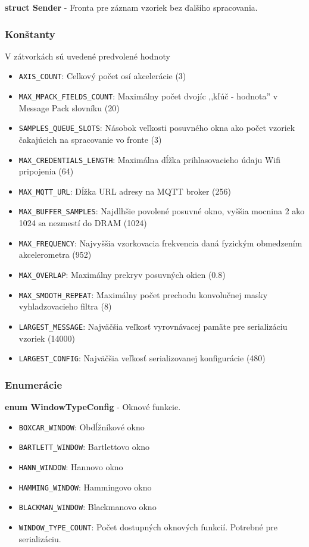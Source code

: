 \noindent\textbf{struct Sender} - Fronta pre záznam vzoriek bez ďalšiho spracovania.
\bigbreak

\subsubsection*{Konštanty}
V zátvorkách sú uvedené predvolené hodnoty
\begin{itemize}[noitemsep, topsep=0pt]
	\item \verb|AXIS_COUNT|: Celkový počet osí akcelerácie (3)
	\item \verb|MAX_MPACK_FIELDS_COUNT|: Maximálny počet dvojíc ,,kľúč - hodnota'' v Message Pack slovníku (20)
	\item \verb|SAMPLES_QUEUE_SLOTS|: Násobok veľkosti posuvného okna ako počet vzoriek čakajúcich na spracovanie vo fronte (3)
	\item \verb|MAX_CREDENTIALS_LENGTH|: Maximálna dĺžka prihlasovacieho údaju Wifi pripojenia (64)
	\item \verb|MAX_MQTT_URL|: Dĺžka URL adresy na MQTT broker (256)
	\item \verb|MAX_BUFFER_SAMPLES|: Najdlhšie povolené posuvné okno, vyššia mocnina 2 ako 1024 sa nezmestí do DRAM (1024)
	\item \verb|MAX_FREQUENCY|: Najvyššia vzorkovacia frekvencia daná fyzickým obmedzením akcelerometra (952)
	\item \verb|MAX_OVERLAP|:  Maximálny prekryv posuvných okien (0.8)
	\item \verb|MAX_SMOOTH_REPEAT|:  Maximálny počet prechodu konvolučnej masky vyhladzovacieho filtra (8)
	\item \verb|LARGEST_MESSAGE|: Najväčšia veľkosť vyrovnávacej pamäte pre serializáciu vzoriek (14000)
	\item \verb|LARGEST_CONFIG|: Najväčšia veľkosť serializovanej konfigurácie (480)
\end{itemize}


\subsubsection*{Enumerácie}
\noindent\textbf{enum WindowTypeConfig} - Oknové funkcie.
	\begin{itemize}[noitemsep, topsep=0pt]
		\item \verb|BOXCAR_WINDOW|: Obdĺžníkové okno
		\item \verb|BARTLETT_WINDOW|: Bartlettovo okno
		\item \verb|HANN_WINDOW|: Hannovo okno
		\item \verb|HAMMING_WINDOW|: Hammingovo okno
		\item \verb|BLACKMAN_WINDOW|: Blackmanovo okno
		\item \verb|WINDOW_TYPE_COUNT|: Počet dostupných oknových funkcií. Potrebné pre serializáciu.
	\end{itemize}
\bigbreak


